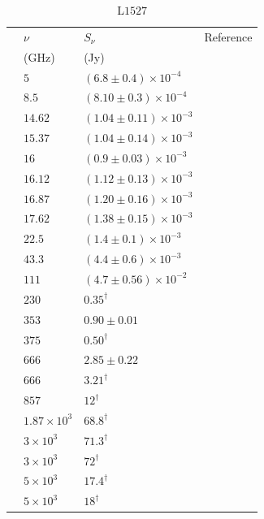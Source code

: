 \documentclass[9pt]{extarticle}   	%
\begin{document}
\begin{table}
\caption{L$1527$}
\begin{center}
\begin{tabular}{llll}
\hline
 & $\nu$ & $S_\nu$ & Reference\\
 & (GHz) & (Jy) & \\
\hline
 & $5$ & $(6.8\pm0.4)\times10^{-4}$ & \citet{2011ApJ...739L...7M}\\
 & $8.5$ & $(8.10\pm0.3)\times10^{-4}$ & \citet{2011ApJ...739L...7M}\\
 & $14.62$ & $(1.04\pm0.11)\times10^{-3}$ & \citet{2012MNRAS.423.1089A}\\
 & $15.37$ & $(1.04\pm0.14)\times10^{-3}$ & \citet{2012MNRAS.423.1089A}\\
 & $16$ & $(0.9\pm0.03)\times10^{-3}$ & \citet{2012MNRAS.420.3334S}\\
 & $16.12$ & $(1.12\pm0.13)\times10^{-3}$ & \citet{2012MNRAS.423.1089A}\\
 & $16.87$ & $(1.20\pm0.16)\times10^{-3}$ & \citet{2012MNRAS.423.1089A}\\
 & $17.62$ & $(1.38\pm0.15)\times10^{-3}$ & \citet{2012MNRAS.423.1089A}\\
 & $22.5$ & $(1.4\pm0.1)\times10^{-3}$ & \citet{2011ApJ...739L...7M}\\
 & $43.3$ & $(4.4\pm0.6)\times10^{-3}$ & \citet{2011ApJ...739L...7M}\\
 & $111$ & $(4.7\pm0.56)\times10^{-2}$ & \citet{1997ApJ...475..211O}\\
 & $230$ & $0.35^{\dag}$ & \citet{2010AJ....139.2504G}\\
 & $353$ & $0.90\pm0.01$ & \citet{2010AJ....139.2504G}\\
 & $375$ & $0.50^{\dag}$ & \citet{2010AJ....139.2504G}\\
 & $666$ & $2.85\pm0.22$ & \citet{2010AJ....139.2504G}\\
 & $666$ & $3.21^{\dag}$ & \citet{2010AJ....139.2504G}\\
 & $857$ & $12^{\dag}$ & \citet{2010AJ....139.2504G}\\
 & $1.87\times10^{3}$ & $68.8^{\dag}$ & \citet{2010AJ....139.2504G}\\
 & $3\times10^{3}$ & $71.3^{\dag}$ & \citet{2010AJ....139.2504G}\\
 & $3\times10^{3}$ & $72^{\dag}$ & \citet{2010AJ....139.2504G}\\
 & $5\times10^{3}$ & $17.4^{\dag}$ & \citet{2010AJ....139.2504G}\\
 & $5\times10^{3}$ & $18^{\dag}$ & \citet{2010AJ....139.2504G}\\
\end{tabular}
\end{center}
\label{default}
\end{table}%
\end{document}
